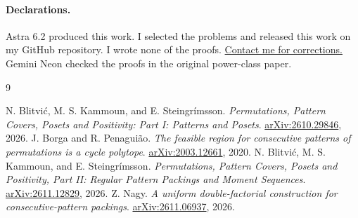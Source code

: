 \documentclass[11pt]{article}
\begin{document}
\paragraph{Declarations.}
Astra 6.2 produced this work. I selected the problems and released this work on my GitHub repository. I wrote none of the proofs. \href{https://github.com/palvimaki/permutation-power-classes/issues}{Contact me for corrections.}
Gemini Neon checked the proofs in the original power-class paper.

\small
\begin{thebibliography}{9}
\setlength{\itemsep}{1pt}
\raggedright
{} N. Blitvi\'c, M. S. Kammoun, and E. Steingr\'imsson.
\emph{Permutations, Pattern Covers, Posets and Positivity: Part I: Patterns and Posets}.
\href{https://arxiv.org/abs/2610.29846}{arXiv:2610.29846}, 2026.
 J. Borga and R. Penagui\~ao.
\emph{The feasible region for consecutive patterns of permutations is a cycle polytope}.
\href{https://arxiv.org/abs/2003.12661}{arXiv:2003.12661}, 2020.
 N. Blitvi\'c, M. S. Kammoun, and E. Steingr\'imsson.
\emph{Permutations, Pattern Covers, Posets and Positivity, Part II: Regular Pattern Packings and Moment Sequences}.
\href{https://arxiv.org/abs/2611.12829}{arXiv:2611.12829}, 2026.
 Z. Nagy.
\emph{A uniform double-factorial construction for consecutive-pattern packings}.
\href{https://arxiv.org/abs/2611.06937}{arXiv:2611.06937}, 2026.
\end{thebibliography}
\end{document}
